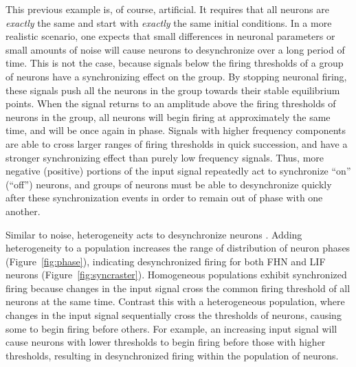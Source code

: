 \documentclass[letterpaper,11pt]{article}
\begin{document}
This previous example is, of course, artificial. It requires that all neurons are \emph{exactly} the same and start with \emph{exactly} the same initial conditions. In a more realistic scenario, one expects that small differences in neuronal parameters or small amounts of noise will cause neurons to desynchronize over a long period of time. This is not the case, because signals below the firing thresholds of a group of neurons have a synchronizing effect on the group. By stopping neuronal firing, these signals push all the neurons in the group towards their stable equilibrium points. When the signal returns to an amplitude above the firing thresholds of neurons in the group, all neurons will begin firing at approximately the same time, and will be once again in phase. Signals with higher frequency components are able to cross larger ranges of firing thresholds in quick succession, and have a stronger synchronizing effect than purely low frequency signals. Thus, more negative (positive) portions of the input signal repeatedly act to synchronize ``on'' (``off'') neurons, and groups of neurons must be able to desynchronize quickly after these synchronization events in order to remain out of phase with one another.

Similar to noise,
heterogeneity acts to desynchronize neurons \citep{Burton2012}.
Adding heterogeneity to a population
increases the range of distribution of neuron phases (Figure~\ref{fig:phase}),
indicating desynchronized firing
for both FHN and LIF neurons (Figure~\ref{fig:syncraster}).
Homogeneous populations exhibit synchronized firing
because changes in the input signal cross the common firing threshold
of all neurons at the same time.
Contrast this with a heterogeneous population,
where changes in the input signal
sequentially cross the thresholds of neurons,
causing some to begin firing before others.
For example, an increasing input signal
will cause neurons with lower thresholds
to begin firing before those with higher thresholds,
resulting in desynchronized firing within the population of neurons.
\end{document}
